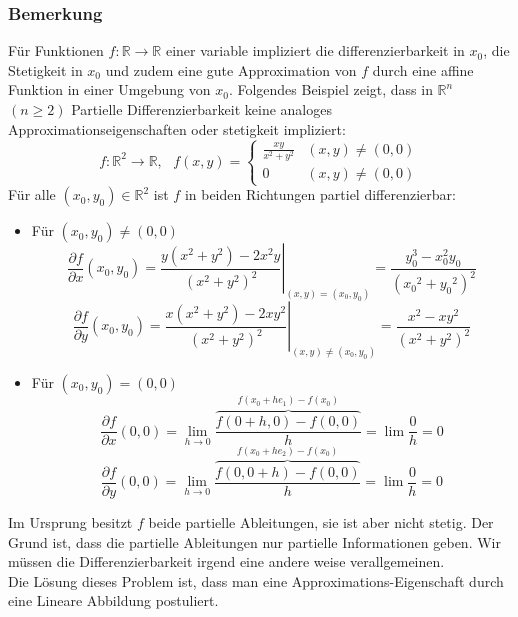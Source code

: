 \subsubsection*{Bemerkung}
Für Funktionen $f:\mathbb{R}\rightarrow\mathbb{R}$ einer variable impliziert die differenzierbarkeit in $x_0$, die Stetigkeit in $x_0$ und zudem eine gute Approximation von $f$ durch eine affine Funktion in einer Umgebung von $x_0$. Folgendes Beispiel zeigt, dass in $\mathbb{R}^n$ $(n\geq 2)$ Partielle Differenzierbarkeit keine analoges  Approximationseigenschaften oder stetigkeit impliziert:
\[f: \mathbb{R}^2 \to\mathbb{R} ,{\text{ }}f(x,y) = \left\{ {\begin{array}{*{20}{c}}
{\frac{{xy}}{{{x^2} + {y^2}}}}&{(x,y)\not  = (0,0)}\\
0&{(x,y)\not  = (0,0)}
\end{array}} \right.\]
Für alle $\left( x_0,y_0\right) \in\mathbb{R}^2$ ist $f$ in beiden Richtungen partiel differenzierbar:
\begin{itemize}
\item Für $\left( x_0,y_0\right)\not=\left( 0,0\right)$ \[\frac{{\partial f}}{{\partial x}}\left( {{x_0},{y_0}} \right) = {\left. {\frac{{y\left( {{x^2} + {y^2}} \right) - 2{x^2}y}}{{{{\left( {{x^2} + {y^2}} \right)}^2}}}} \right|_{(x,y) = \left( {{x_0},{y_0}} \right)}} = \frac{{y_0^3 - x_0^2{y_0}}}{{{{\left( {{x_0}^2 + {y_0}^2} \right)}^2}}}\]
\[\frac{{\partial f}}{{\partial y}}\left( {{x_0},{y_0}} \right) = {\left. {\frac{{x\left( {{x^2} + {y^2}} \right) - 2x{y^2}}}{{{{\left( {{x^2} + {y^2}} \right)}^2}}}} \right|_{(x,y)\not  = \left( {{x_0},{y_0}} \right)}} = \frac{{{x^2} - x{y^2}}}{{{{\left( {{x^2} + {y^2}} \right)}^2}}}\]
\item Für $\left(x_0,y_0\right)=\left( 0,0\right)$\[\frac{{\partial f}}{{\partial x}}(0,0) = \mathop {\lim }\limits_{h \to 0} \frac{{\overbrace {f\left( {0 + h,0} \right) - f\left( {0,0} \right)}^{f({x_0} + h{e_1}) - f(x_0)}}}{h} = \lim \frac{0}{h} = 0\]\[\frac{{\partial f}}{{\partial y}}(0,0) = \mathop {\lim }\limits_{h \to 0} \frac{{\overbrace {f\left( {0,0 + h} \right) - f\left( {0,0} \right)}^{f({x_0} + h{e_2}) - f({x_0})}}}{h} = \lim \frac{0}{h} = 0\]
\end{itemize}
Im Ursprung besitzt $f$ beide partielle Ableitungen, sie ist aber nicht stetig. Der Grund ist, dass die partielle Ableitungen nur partielle Informationen geben. Wir müssen die Differenzierbarkeit irgend eine andere weise verallgemeinen.\\

Die Lösung dieses Problem ist, dass man eine Approximations-Eigenschaft durch eine Lineare Abbildung postuliert. \\

